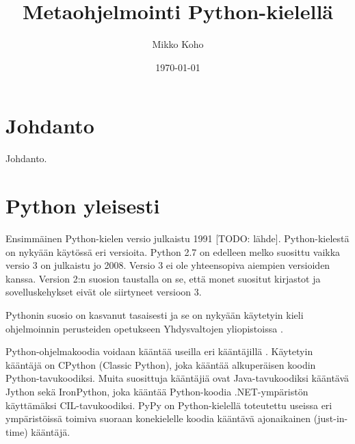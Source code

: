 \documentclass[finnish]{tktltiki2}
\title{Metaohjelmointi Python-kielellä}
\author{Mikko Koho}
\date{\today}
\theoremstyle{definition}
\theoremstyle{remark}
\begin{document}
    

\frontmatter      %

\maketitle        %

\makeabstract     %

\tableofcontents  %


\mainmatter       %


\section{Johdanto}

Johdanto.

\section{Python yleisesti}


Ensimmäinen Python-kielen versio julkaistu 1991 [TODO: lähde]. Python-kielestä on nykyään käytössä eri versioita. Python 2.7 on edelleen melko suosittu vaikka versio 3 on julkaistu jo 2008. Versio 3 ei ole yhteensopiva aiempien versioiden kanssa. Version 2:n suosion taustalla on se, että monet suositut kirjastot ja sovelluskehykset eivät ole siirtyneet versioon 3.

Pythonin suosio on kasvanut tasaisesti ja se on nykyään käytetyin kieli ohjelmoinnin perusteiden opetukseen Yhdysvaltojen yliopistoissa \cite{python-teaching}.

Python-ohjelmakoodia voidaan kääntää useilla eri kääntäjillä \cite{martelli2006python}. Käytetyin kääntäjä on CPython (Classic Python), joka kääntää alkuperäisen koodin Python-tavukoodiksi. Muita suosittuja kääntäjiä ovat Java-tavukoodiksi kääntävä Jython sekä IronPython, joka kääntää Python-koodia .NET-ympäristön käyttämäksi CIL-tavukoodiksi. PyPy on Python-kielellä toteutettu useissa eri ympäristöissä toimiva suoraan konekielelle koodia kääntävä ajonaikainen (just-in-time) kääntäjä.
\end{document}

